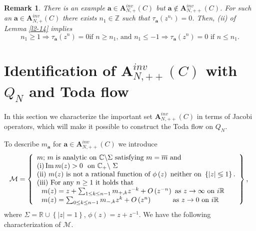 \documentclass[a4paper]{article}%
\newtheorem{remark}{Remark}
\begin{document}
\begin{remark}
\label{r1}There is an example $\boldsymbol{a}\in\boldsymbol{A}_{N,+}%
^{inv}\left(  C\right)  $ but $\boldsymbol{a}\notin\boldsymbol{A}_{N,++}%
^{inv}\left(  C\right)  $. For such an $\boldsymbol{a}\in\boldsymbol{A}%
_{N,+}^{inv}\left(  C\right)  $ there exists $n_{1}\in\mathbb{Z}$ such that
$\tau_{\boldsymbol{a}}\left(  z^{n_{1}}\right)  =0$. Then, (ii) of Lemma
\ref{l2-14} implies%
\[
n_{1}\geq1\Longrightarrow\tau_{\boldsymbol{a}}\left(  z^{n}\right)  =0\text{
if }n\geq n_{1}\text{, and }n_{1}\leq-1\Longrightarrow\tau_{\boldsymbol{a}%
}\left(  z^{n}\right)  =0\text{ if }n\leq n_{1}\text{.}%
\]

\end{remark}

\section{Identification of $\boldsymbol{A}_{N,++}^{inv}\left(  C\right)  $
with $Q_{N}$ and Toda flow}

In this section we characterize the important set $\boldsymbol{A}_{N,++}%
^{inv}\left(  C\right)  $ in terms of Jacobi operators, which will make it
possible to construct the Toda flow on $Q_{N}$.

To describe $m_{\boldsymbol{a}}$ for $\boldsymbol{a}\in\boldsymbol{A}%
_{N,++}^{inv}\left(  C\right)  $ we introduce
\begin{equation}
\mathcal{M}=\left\{
\begin{array}
[c]{l}%
m\text{; }m\text{ is analytic on }\mathbb{C}\backslash\Sigma\text{ satisfying
}m=\overline{m}\text{ and}\\
\text{(i)}\operatorname{Im}m(z)>0\text{ \ on }\mathbb{C}_{+}\backslash
\text{\ }\Sigma\\
\text{(ii) }m(z)\text{ is not a rational function of }\phi\left(  z\right)
\text{ neither on }\left\{  \left\vert z\right\vert \lessgtr1\right\}
\text{.}\\
\text{(iii) For any }n\geq1\text{ it holds that}\\
\text{ \ }m(z)=z+\sum_{1\leq k\leq n-1}m_{+,k}z^{-k}+O\left(  z^{-n}\right)
\text{ as }z\rightarrow\infty\text{ on }i\mathbb{R}\\
\text{ \ }m(z)=\sum_{0\leq k\leq n-1}m_{-,k}z^{k}+O\left(  z^{n}\right)
\text{ \ \ \ \ \ \ \ \ as }z\rightarrow0\text{ on }i\mathbb{R}%
\end{array}
\right\}  \text{, } \label{3-1}%
\end{equation}
where $\Sigma=\mathbb{R}\cup\left\{  \left\vert z\right\vert =1\right\}  $,
$\phi\left(  z\right)  =z+z^{-1}$. We have the following characterization of
$\mathcal{M}$.
\end{document}
